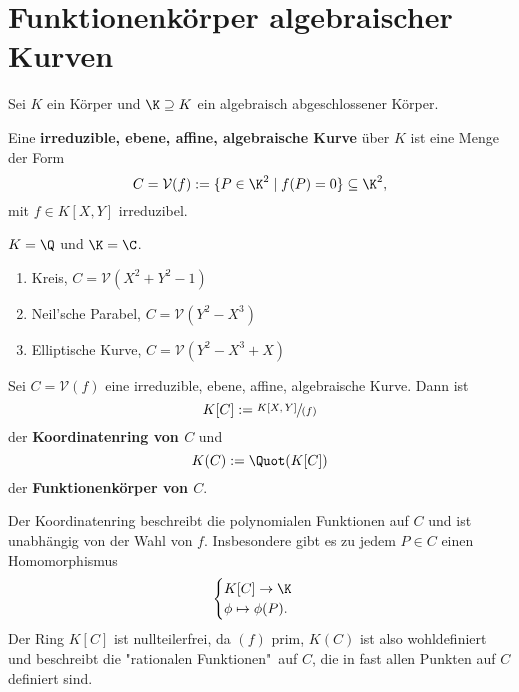 \section{Funktionenkörper algebraischer Kurven}
Sei $K$ ein Körper und $\K \supseteq K$ ein algebraisch abgeschlossener Körper.

\begin{definition}
    Eine \textbf{irreduzible, ebene, affine, algebraische Kurve} über $K$ ist eine Menge der Form
    $$ C = \mathcal{V}(f) := \{P \in \K^2 \mid f(P) = 0\} \subseteq \K^2,$$
    mit $f \in K[X,Y]$ irreduzibel.
\end{definition}

\begin{beispiel}\label{beispiel:2.2}
    $K = \Q$ und $\K = \C$.
    \begin{enumerate}[label=\alph*)]
        \item Kreis, $C = \mathcal{V}(X^2 + Y^2 - 1)$
        \item Neil'sche Parabel, $C = \mathcal{V}(Y^2 - X^3)$
        \item Elliptische Kurve, $C = \mathcal{V}(Y^2 - X^3 + X)$
    \end{enumerate}
\end{beispiel}

\begin{definition}
    Sei $C = \mathcal{V}(f)$ eine irreduzible, ebene, affine, algebraische Kurve. 
    Dann ist $$ K[C] := \sfrac{K[X,Y]}{(f)} $$ der \textbf{Koordinatenring von $C$} und
    $$ K(C) := \Quot(K[C]) $$ der \textbf{Funktionenkörper von $C$}.
\end{definition}

\begin{bemerkungnr}
    Der Koordinatenring beschreibt die polynomialen Funktionen auf $C$ und ist unabhängig von der Wahl von $f$.
    Insbesondere gibt es zu jedem $P \in C$ einen Homomorphismus
    $$ \begin{cases}
        K[C] \to \K \\
        \phi \mapsto \phi(P).
    \end{cases}$$
    Der Ring $K[C]$ ist nullteilerfrei, da $(f)$ prim, $K(C)$ ist also wohldefiniert und beschreibt die 
    "rationalen Funktionen"\ auf $C$, die in fast allen Punkten auf $C$ definiert sind.
\end{bemerkungnr}

